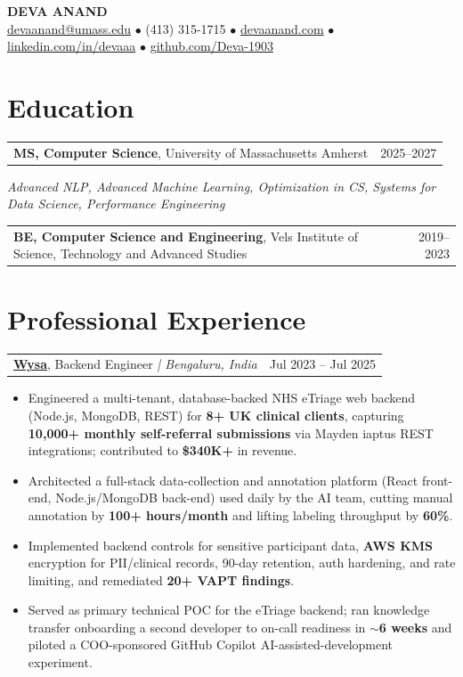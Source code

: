 \documentclass[letterpaper,11pt]{article}
\makeatletter
\newcommand{\eduItem}[3]{%
  \begin{tabular*}{\textwidth}{@{}l@{\extracolsep{\fill}}r@{}}
    \textbf{#1}, #2 & #3 \\
  \end{tabular*}\par
}
\newcommand{\expItem}[4]{%
  \vspace{2pt}
  \begin{tabular*}{\textwidth}{@{}l@{\extracolsep{\fill}}r@{}}
    \textbf{#1}, #2 \textit{| #3} & #4 \\
  \end{tabular*}\par\vspace{-2pt}
}
\makeatother
\begin{document}
\begin{center}
    {\fontsize{18}{20}\selectfont\bfseries DEVA ANAND}\\ \vspace{3pt}
    {\small
    \href{mailto:devaanand@umass.edu}{devaanand@umass.edu}
    \enspace$\bullet$\enspace
    (413) 315-1715
    \enspace$\bullet$\enspace
    \href{https://devaanand.com}{devaanand.com}
    \enspace$\bullet$\enspace
    \href{https://linkedin.com/in/devaaa/}{linkedin.com/in/devaaa}
    \enspace$\bullet$\enspace
    \href{https://github.com/Deva-1903}{github.com/Deva-1903}}
\end{center}
\vspace{-6pt}

\section{Education}
\eduItem{MS, Computer Science}{University of Massachusetts Amherst}{2025--2027}
{\small\textit{Advanced NLP, Advanced Machine Learning, Optimization in CS, Systems for Data Science, Performance Engineering}}\par
\vspace{3pt}
\eduItem{BE, Computer Science and Engineering}{Vels Institute of Science, Technology and Advanced Studies}{2019--2023}

\section{Professional Experience}

\expItem{\href{https://www.wysa.io}{Wysa}}{Backend Engineer}{Bengaluru, India}{Jul 2023 -- Jul 2025}
\begin{itemize}
  \item Engineered a multi-tenant, database-backed NHS eTriage web backend (Node.js, MongoDB, REST) for \textbf{8+ UK clinical clients}, capturing \textbf{10{,}000+ monthly self-referral submissions} via Mayden iaptus REST integrations; contributed to \textbf{\$340K+} in revenue.
  \item Architected a full-stack data-collection and annotation platform (React front-end, Node.js/MongoDB back-end) used daily by the AI team, cutting manual annotation by \textbf{100+ hours/month} and lifting labeling throughput by \textbf{60\%}.
  \item Implemented backend controls for sensitive participant data, \textbf{AWS KMS} encryption for PII/clinical records, 90-day retention, auth hardening, and rate limiting, and remediated \textbf{20+ VAPT findings}.
  \item Served as primary technical POC for the eTriage backend; ran knowledge transfer onboarding a second developer to on-call readiness in \textbf{$\sim$6 weeks} and piloted a COO-sponsored GitHub Copilot AI-assisted-development experiment.
\end{itemize}
\end{document}
